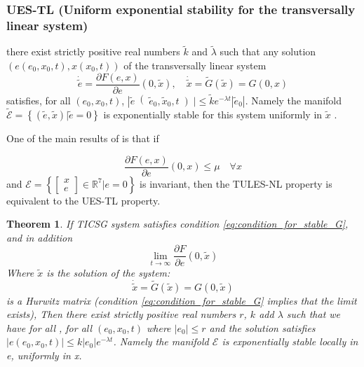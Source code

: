 \documentclass[letterpaper, 10 pt, conference]{ieeeconf}  %
\newtheorem{theorem}{Theorem}[section]
\begin{document}
\subsubsection{UES-TL (Uniform exponential stability for the transversally linear system)}
there exist strictly positive real numbers $\tilde{ k}$ and $\tilde{\lambda}$  such that any solution $\left(e \left(e_0, x_0, t\right), x \left(x_0, t\right)\right)$ of the transversally linear system
$$\dot{\tilde{e}} = \frac{\partial F(e,x)}{\partial e}\left(0,\tilde{x}\right) ,\quad \dot{\tilde{x}} = \tilde{G}  \left( \tilde{x}  \right) =G\left(0,x\right)$$
satisfies, for all $\left(e_0,x_0,t\right)$,   
 $ \left| \tilde{e}\right(\tilde{e}_0,\tilde{x}_0,t \left) \right| \le \tilde{k} e^{-\lambda t} \left| \tilde{e}_0\right|$. Namely the manifold $\tilde{\mathscr{E}}=\left\{\left(\tilde{e},\tilde{x} \right)| \tilde{e} = 0 \right\}$  is exponentially stable for this system uniformly in $\tilde{x}$ .


One of the main results of \cite{AndrieuJayawardhanaPraly} is that if 

\begin{equation}
\frac{\partial F(e,x)}{\partial e}(0,x)\le \mu \quad\forall x  \label{eq:assumption1}
\end{equation}
and 
$\mathscr{E}=\left\{ \left[\begin{array}{c}
x\\
e
\end{array}\right]\in\mathbb{R}^{7}|e=0\right\} $ is invariant, then 
the TULES-NL property is equivalent to the UES-TL property.

\begin{theorem}
If TICSG system satisfies  condition \eqref{eq:condition_for_stable_G}, and in addition 
$$\lim_{t \to \infty}\frac{\partial F}{\partial e}(0,\tilde{x})$$
Where $\tilde{x}$ is the solution of the system:
$$
\dot{\tilde{x}}=\tilde{G}(\tilde{x})=G(0,\tilde{x})
$$
 is a Hurwitz matrix (condition \eqref{eq:condition_for_stable_G} implies that the limit exists), Then there exist strictly positive real numbers $r$, $k$ add $\lambda$ such that we have for all , for all $\left(e_0, x_0, t\right)$  where $\left| e_0\right| \le r$ and the solution satisfies $\left|e\left(e_0, x_0, t\right)\right| \le k\left|e_0\right| e^{-\lambda t}$. Namely the manifold $\mathscr{E}$ is exponentially stable locally in e, uniformly in x.
\end{theorem}
 
\end{document}
